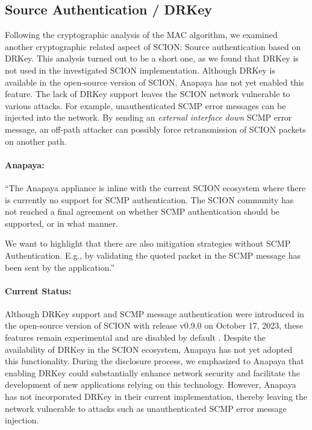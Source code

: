\subsection{Source Authentication / DRKey}
\label{sec:source-authentication}
Following the cryptographic analysis of the MAC algorithm, we examined another cryptographic related aspect of SCION: Source authentication based on DRKey.
This analysis turned out to be a short one, as we found that DRKey is not used in the investigated SCION implementation.
Although DRKey is available in the open-source version of SCION, Anapaya has not yet enabled this feature.
The lack of DRKey support leaves the SCION network vulnerable to various attacks.
For example, unauthenticated SCMP error messages can be injected into the network.
By sending an \textit{external interface down} SCMP error message, an off-path attacker can possibly force retransmission of SCION packets on another path.
\newpage
\begin{boxH}
\paragraph{Anapaya:}
``The Anapaya appliance is inline with the current SCION ecosystem where there is currently no support for SCMP authentication. The SCION community has not reached a final agreement on whether SCMP authentication should be supported, or in what manner.

We want to highlight that there are also mitigation strategies without SCMP Authentication. E.g., by validating the quoted packet in the SCMP message has been sent by the application.''
\end{boxH}


\paragraph{Current Status:}
Although DRKey support and SCMP message authentication were introduced in the open-source version of SCION with release v0.9.0 on October 17, 2023, these features remain experimental and are disabled by default \cite{SCIONReleaseV090}.
Despite the availability of DRKey in the SCION ecosystem, Anapaya has not yet adopted this functionality.
During the disclosure process, we emphasized to Anapaya that enabling DRKey could substantially enhance network security and facilitate the development of new applications relying on this technology.
However, Anapaya has not incorporated DRKey in their current implementation, thereby leaving the network vulnerable to attacks such as unauthenticated SCMP error message injection.



